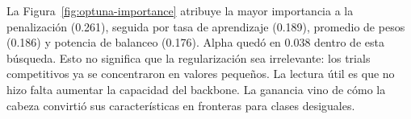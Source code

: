 La Figura~\ref{fig:optuna-importance} atribuye la mayor importancia a la
penalización (0.261), seguida por tasa de aprendizaje (0.189), promedio de
pesos (0.186) y potencia de balanceo (0.176). Alpha quedó en 0.038 dentro de
esta búsqueda. Esto no significa que la regularización sea irrelevante: los
trials competitivos ya se concentraron en valores pequeños. La lectura útil es
que no hizo falta aumentar la capacidad del backbone. La ganancia vino de cómo
la cabeza convirtió sus características en fronteras para clases desiguales.
